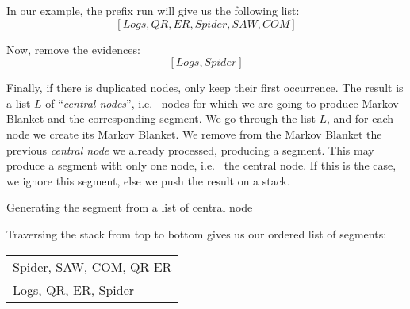 \documentclass[a4paper]{article}
\newcommand*{\say}[1]{``{#1}''}
\newcommand*{\ie}{i.e.\ }
\begin{document}
In our example, the prefix run will give us the following list:
\[
  [Logs, QR, ER, Spider, SAW, COM]
\]

Now, remove the evidences:
\[
  [Logs, Spider]
\]

Finally, if there is duplicated nodes, only keep their first occurrence.
The result is a list $L$ of \say{\emph{central nodes}}, \ie{} nodes for which we are going to produce Markov Blanket
and the corresponding segment.
We go through the list $L$, and for each node we create its Markov Blanket.
We remove from the Markov Blanket the previous \emph{central node} we already processed,
producing a segment.
This may produce a segment with only one node, \ie{} the central node.
If this is the case, we ignore this segment, else we push the result on a stack.

\begin{algorithm2e}[H]
  \caption{Generating the segment from a list of central node}

\end{algorithm2e}

Traversing the stack from top to bottom gives us our ordered list of segments:

\begin{tabular}{l}
  Spider, SAW, COM, QR ER\\
  Logs, QR, ER, Spider
\end{tabular}
\end{document}
